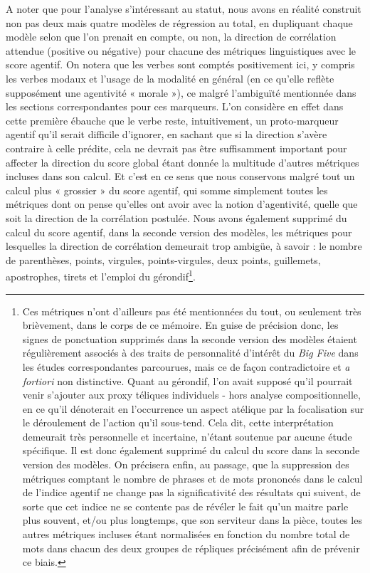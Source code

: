 A noter que pour l’analyse s’intéressant au statut, nous avons en réalité construit non pas deux mais quatre modèles de régression au total, en dupliquant chaque modèle selon que l’on prenait en compte, ou non, la direction de corrélation attendue (positive ou négative) pour chacune des métriques linguistiques avec le score agentif. On notera que les verbes sont comptés positivement ici, y compris les verbes modaux et l'usage de la modalité en général (en ce qu'elle reflète supposément une agentivité  « morale »), ce malgré l'ambiguïté mentionnée dans les sections correspondantes pour ces marqueurs. L'on considère en effet dans cette première ébauche que le verbe reste, intuitivement, un proto-marqueur agentif qu'il serait difficile d'ignorer, en sachant que si la direction s'avère contraire à celle prédite, cela ne devrait pas être suffisamment important pour affecter la direction du score global étant donnée la multitude d'autres métriques incluses dans son calcul. Et c'est en ce sens que nous conservons malgré tout un calcul plus  « grossier » du score agentif, qui somme simplement toutes les métriques dont on pense qu'elles ont avoir avec la notion d'agentivité, quelle que soit la direction de la corrélation postulée.
Nous avons également supprimé du calcul du score agentif, dans la seconde version des modèles, les métriques pour lesquelles la direction de corrélation demeurait trop ambigüe, à savoir : le nombre de parenthèses, points, virgules, points-virgules, deux points, guillemets, apostrophes, tirets et l'emploi du gérondif\footnote{Ces métriques n'ont d'ailleurs pas été mentionnées du tout, ou seulement très brièvement, dans le corps de ce mémoire. En guise de précision donc, les signes de ponctuation supprimés dans la seconde version des modèles étaient régulièrement associés à des traits de personnalité d'intérêt du \textit{Big Five} dans les études correspondantes parcourues, mais ce de façon contradictoire et \textit{a fortiori }non distinctive. Quant au gérondif, l'on avait supposé qu'il pourrait venir s'ajouter aux proxy téliques individuels - hors analyse compositionnelle, en ce qu'il dénoterait en l'occurrence un aspect atélique par la focalisation sur le déroulement de l'action qu'il sous-tend. Cela dit, cette interprétation demeurait très personnelle et incertaine, n'étant soutenue par aucune étude spécifique. Il est donc également supprimé du calcul du score dans la seconde version des modèles. On précisera enfin, au passage, que la suppression des métriques comptant le nombre de phrases et de mots prononcés dans le calcul de l'indice agentif ne change pas la significativité des résultats qui suivent, de sorte que cet indice ne se contente pas de révéler le fait qu'un maitre parle plus souvent, et/ou plus longtemps, que son serviteur dans la pièce, toutes les autres métriques incluses étant normalisées en fonction du nombre total de mots dans chacun des deux groupes de répliques précisément afin de prévenir ce biais.}.

